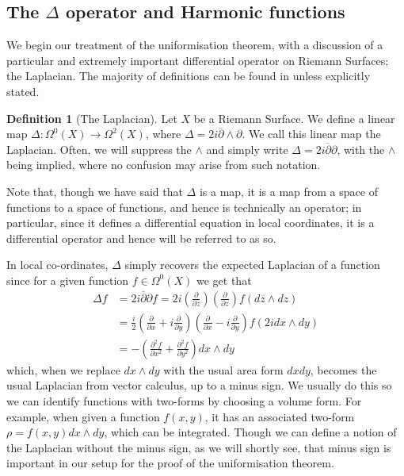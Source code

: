 \documentclass[11pt]{report}
\theoremstyle{definition}
\newtheorem{defn}[thm]{Definition}
\begin{document}
\subsection{The $\Delta$ operator and Harmonic functions}
We begin our treatment of the uniformisation theorem, with a discussion of a particular and extremely important differential operator on Riemann Surfaces; the Laplacian. The majority of definitions can be found in \cite{donaldson} unless explicitly stated.

\begin{defn}[The Laplacian]\label{LaplacianDef}
  Let $X$ be a Riemann Surface. We define a linear map $\Delta:\Omega^0(X)\rightarrow \Omega^2(X)$, where $\Delta=2i\overline{\partial}\wedge\partial$. We call this linear map the Laplacian. Often, we will suppress the $\wedge$ and simply write $\Delta=2i\overline{\partial}\partial$, with the $\wedge$ being implied, where no confusion may arise from such notation.
\end{defn}

Note that, though we have said that $\Delta$ is a map, it is a map from a space of functions to a space of functions, and hence is technically an operator; in particular, since it defines a differential equation in local coordinates, it is a differential operator and hence will be referred to as so.

In local co-ordinates, $\Delta$ simply recovers the expected Laplacian of a function since for a given function $f\in \Omega^0(X)$ we get that 
\begin{align*}
  \Delta f &= 2i\overline{\partial }\partial f = 2i(\frac{\partial}{\partial\overline{z}})(\frac{\partial}{\partial z})f(d\overline{z}\wedge dz) \\
  &=\frac{i}{2}(\frac{\partial}{\partial x} + i\frac{\partial}{\partial y})(\frac{\partial}{\partial x} - i\frac{\partial}{\partial y})f(2idx\wedge dy) \\
  &= -(\frac{\partial^2 f}{\partial x^2} + \frac{\partial^2 f}{\partial y^2})dx\wedge dy 
\end{align*}
which, when we replace $dx\wedge dy$ with the usual area form $dxdy$, becomes the usual Laplacian from vector calculus, up to a minus sign. We usually do this so we can identify functions with two-forms by choosing a volume form. For example, when given a function $f(x,y)$, it has an associated two-form $\rho = f(x,y) dx\wedge dy$, which can be integrated. Though we can define a notion of the Laplacian without the minus sign, as we will shortly see, that minus sign is important in our setup for the proof of the uniformisation theorem. 
\end{document}
